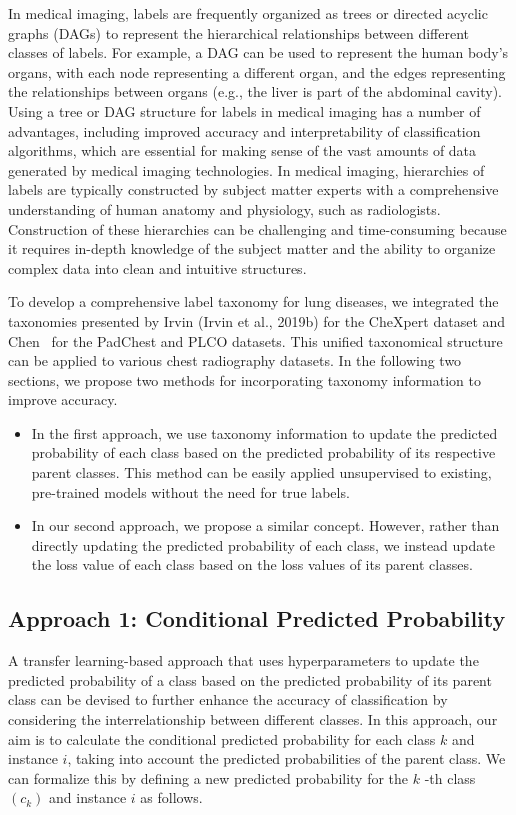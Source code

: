 \documentclass[preprint,3p,times, review]{elsarticle}
\begin{document}
In medical imaging, labels are frequently organized as trees or directed acyclic graphs (DAGs) to represent the hierarchical relationships between different classes of labels. For example, a DAG can be used to represent the human body's organs, with each node representing a different organ, and the edges representing the relationships between organs (e.g., the liver is part of the abdominal cavity). Using a tree or DAG structure for labels in medical imaging has a number of advantages, including improved accuracy and interpretability of classification algorithms, which are essential for making sense of the vast amounts of data generated by medical imaging technologies. In medical imaging, hierarchies of labels are typically constructed by subject matter experts with a comprehensive understanding of human anatomy and physiology, such as radiologists. Construction of these hierarchies can be challenging and time-consuming because it requires in-depth knowledge of the subject matter and the ability to organize complex data into clean and intuitive structures.

To develop a comprehensive label taxonomy for lung diseases, we integrated the taxonomies presented by Irvin (Irvin et al., 2019b) for the CheXpert dataset and Chen~\cite{1902693:27875851} for the PadChest and PLCO datasets. This unified taxonomical structure can be applied to various chest radiography datasets. In the following two sections, we propose two methods for incorporating taxonomy information to improve accuracy.

\begin{itemize}
    \item In the first approach, we use taxonomy information to update the predicted probability of each class based on the predicted probability of its respective parent classes. This method can be easily applied unsupervised to existing, pre-trained models without the need for true labels.

    \item  In our second approach, we propose a similar concept. However, rather than directly updating the predicted probability of each class, we instead update the loss value of each class based on the loss values of its parent classes.
\end{itemize}

\subsection{Approach 1: Conditional Predicted Probability}A transfer learning-based approach that uses hyperparameters to update the predicted probability of a class based on the predicted probability of its parent class can be devised to further enhance the accuracy of classification by considering the interrelationship between different classes. In this approach, our aim is to calculate the conditional predicted probability for each class $k $ and instance $i $, taking into account the predicted probabilities of the parent class. We can formalize this by defining a new predicted probability for the $k $ -th class $(c_k) $ and instance $i $ as follows.
\end{document}
